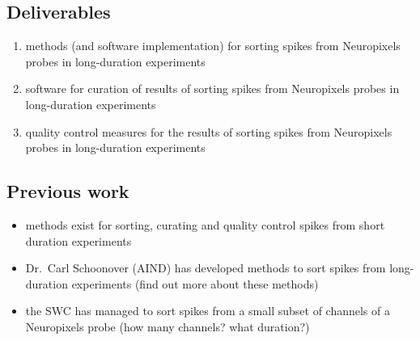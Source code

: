 
\subsection{Deliverables}

\begin{enumerate}

    \item methods (and software implementation) for sorting spikes from
    Neuropixels probes in long-duration experiments

    \item software for curation of results of sorting spikes from Neuropixels
    probes in long-duration experiments

    \item quality control measures for the results of sorting spikes from
    Neuropixels probes in long-duration experiments

\end{enumerate}

\subsection{Previous work}

\begin{itemize}

    \item methods exist for sorting, curating and quality control spikes from
    short duration experiments

    \item Dr.~Carl Schoonover (AIND) has developed methods to sort spikes from
    long-duration experiments (find out more about these methods)

    \item the SWC has managed to sort spikes from a small subset of channels of
        a Neuropixels probe (how many channels? what duration?)

\end{itemize}

